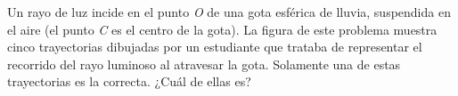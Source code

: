 
Un rayo de luz incide en el punto \textit{O} de una gota esférica de lluvia, suspendida en el aire (el punto \textit{C} es el centro de la gota). La figura de este problema muestra cinco trayectorias dibujadas por un estudiante que trataba de representar el recorrido del rayo luminoso al atravesar la gota. Solamente una de estas trayectorias es la correcta. ¿Cuál de ellas es?
